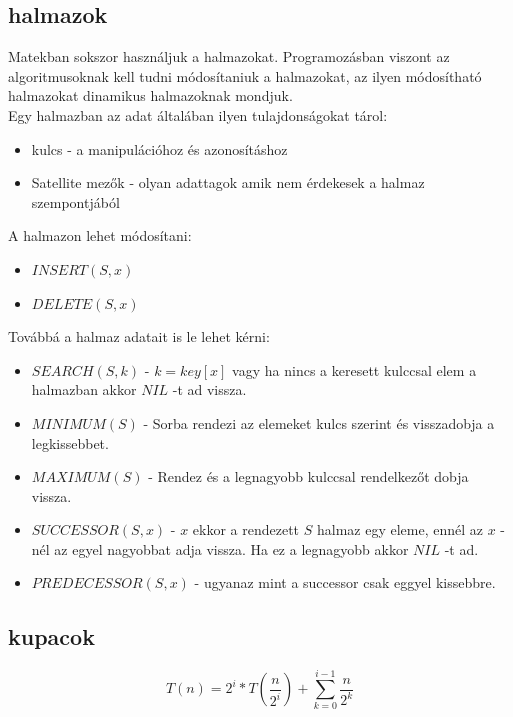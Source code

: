 \documentclass{article}
\theoremstyle{mytheoremstyle}
\theoremstyle{mytheoremstyle}
\theoremstyle{myproblemstyle}
\begin{document}
\subsection{halmazok}
Matekban sokszor használjuk a halmazokat. 
Programozásban viszont az algoritmusoknak kell tudni módosítaniuk 
a halmazokat, az ilyen módosítható halmazokat dinamikus 
halmazoknak mondjuk.\\
Egy halmazban az adat általában ilyen tulajdonságokat tárol:
\begin{itemize}
    \item kulcs - a manipulációhoz és azonosításhoz
    \item Satellite mezők - olyan adattagok amik nem érdekesek a 
    halmaz szempontjából 
\end{itemize} 
A halmazon lehet módosítani:
\begin{itemize}
    \item $INSERT(S,x)$
    \item $DELETE(S,x)$
\end{itemize}
Továbbá a halmaz adatait is le lehet kérni:
\begin{itemize}
    \item $SEARCH(S,k)$ - $k = key[x]$ vagy ha nincs a keresett kulccsal elem a halmazban akkor $NIL$ -t ad vissza.
    \item $MINIMUM(S)$ - Sorba rendezi az elemeket kulcs szerint és visszadobja a legkissebbet.
    \item $MAXIMUM(S)$ - Rendez és a legnagyobb kulccsal rendelkezőt dobja vissza.
    \item $SUCCESSOR(S,x)$ - $x$ ekkor a rendezett $S$ halmaz egy eleme, 
    ennél az $x$ -nél az egyel nagyobbat adja vissza. Ha ez a legnagyobb akkor $NIL$ -t ad.
    \item $PREDECESSOR(S,x)$ - ugyanaz mint a successor csak eggyel kissebbre.
\end{itemize}
\subsection{kupacok}

$$T(n)=2^i*T\left(\frac{n}{2^i}\right)+\sum_{k=0}^{i-1}\frac{n}{2^k}$$
\end{document}
